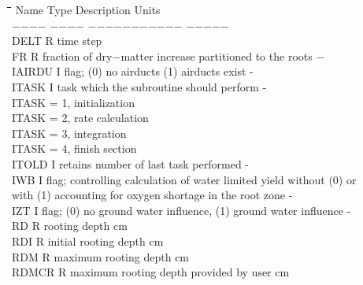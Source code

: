 \documentclass[11pt]{article}
\begin{document}
\begin{tabbing}
\hspace{1.27cm}\=\hspace{1.27cm}\=\hspace{1.27cm}\=\hspace{1.27cm}\=%
\hspace{1.27cm}\=\hspace{1.27cm}\=\hspace{1.27cm}\=\hspace{1.27cm}\=%
\hspace{1.27cm}\=\hspace{1.27cm}\=\kill
Name    \> \> Type   \> Description                                        \> \> \> \> \> \> \> Units\\
$-$$-$$-$$-$    \> \> $-$$-$$-$$-$   \> $-$$-$$-$$-$$-$$-$$-$$-$$-$$-$$-$                                        \> \> \> \> \> \> \> $-$$-$$-$$-$$-$\\
DELT\> \> R\> time step\\
FR      \> \> R   \> fraction of dry$-$matter increase partitioned to the roots      \> \> \> \> \> \> \> $-$\\
IAIRDU\> \> I\> flag; (0) no airducts (1) airducts exist\> \> \> \> \> \> \> -\\
ITASK\> \> I\> task which the subroutine should perform\> \> \> \> \> \> \> -\\
\>\> \> ITASK = 1, initialization\\
\>\> \> ITASK = 2, rate calculation\\
\>\> \> ITASK = 3, integration\\
\>\> \> ITASK = 4, finish section\\
ITOLD\> \> I\> retains number of last task performed\> \> \> \> \> \> \> -\\
IWB\> \> I\> flag; controlling calculation of water limited yield without (0) or \\
\>\> \> with (1) accounting for oxygen shortage in the root zone\> \> \> \> \> \> \> -\\
IZT\> \> I\> flag; (0) no ground water influence, (1) ground water influence\> \> \> \> \> \> \> -\\
RD\> \> R\> rooting depth\> \> \> \> \> \> \> cm\\
RDI\> \> R\> initial rooting depth\> \> \> \> \> \> \> cm\\
RDM\> \> R\> maximum rooting depth\> \> \> \> \> \> \> cm\\
RDMCR\> \> R\> maximum rooting depth provided by user\> \> \> \> \> \> \> cm\\

\end{tabbing}
\end{document}
